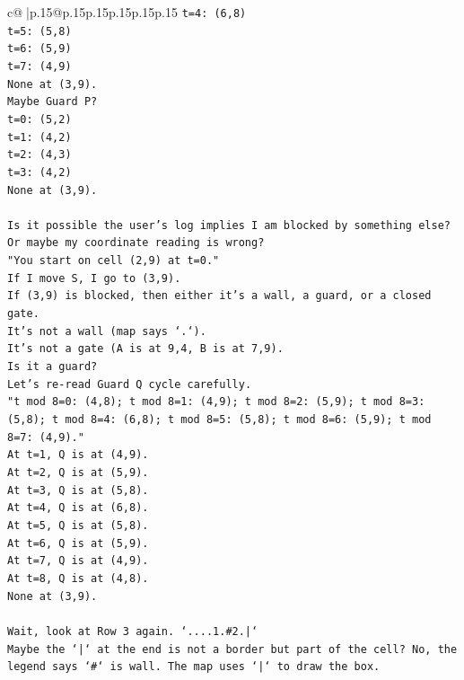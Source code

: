 \documentclass{article}
\begin{document}
{\begin{supertabular}{c@{$\;$}|p{.15\linewidth}@{}p{.15\linewidth}p{.15\linewidth}p{.15\linewidth}p{.15\linewidth}p{.15\linewidth}}
{{{\texttt{t=4: (6,8)} \\
\texttt{t=5: (5,8)} \\
\texttt{t=6: (5,9)} \\
\texttt{t=7: (4,9)} \\
\texttt{None at (3,9).} \\
\texttt{Maybe Guard P?} \\
\texttt{t=0: (5,2)} \\
\texttt{t=1: (4,2)} \\
\texttt{t=2: (4,3)} \\
\texttt{t=3: (4,2)} \\
\texttt{None at (3,9).} \\
\\ 
\texttt{Is it possible the user's log implies I am blocked by something else?} \\
\texttt{Or maybe my coordinate reading is wrong?} \\
\texttt{"You start on cell (2,9) at t=0."} \\
\texttt{If I move S, I go to (3,9).} \\
\texttt{If (3,9) is blocked, then either it's a wall, a guard, or a closed gate.} \\
\texttt{It's not a wall (map says `.`).} \\
\texttt{It's not a gate (A is at 9,4, B is at 7,9).} \\
\texttt{Is it a guard?} \\
\texttt{Let's re{-}read Guard Q cycle carefully.} \\
\texttt{"t mod 8=0: (4,8); t mod 8=1: (4,9); t mod 8=2: (5,9); t mod 8=3: (5,8); t mod 8=4: (6,8); t mod 8=5: (5,8); t mod 8=6: (5,9); t mod 8=7: (4,9)."} \\
\texttt{At t=1, Q is at (4,9).} \\
\texttt{At t=2, Q is at (5,9).} \\
\texttt{At t=3, Q is at (5,8).} \\
\texttt{At t=4, Q is at (6,8).} \\
\texttt{At t=5, Q is at (5,8).} \\
\texttt{At t=6, Q is at (5,9).} \\
\texttt{At t=7, Q is at (4,9).} \\
\texttt{At t=8, Q is at (4,8).} \\
\texttt{None at (3,9).} \\
\\ 
\texttt{Wait, look at Row 3 again. `....1.\#2.|`} \\
\texttt{Maybe the `|` at the end is not a border but part of the cell? No, the legend says `\#` is wall. The map uses `|` to draw the box.} \\
}}}
\end{supertabular}}
\end{document}
